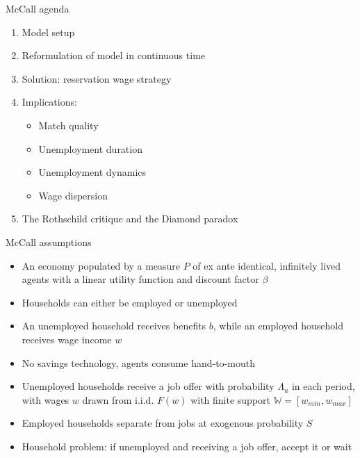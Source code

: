 \documentclass[9pt]{beamer}
\newcommand{\bit}{\begin{itemize}}
\newcommand{\eit}{\end{itemize}}
\newcommand{\ben}{\begin{enumerate}}
\newcommand{\een}{\end{enumerate}}
\newcommand{\bc}{\color{blue}}
\newcommand{\rc}{\color{red}}
\begin{document}
\begin{frame}{McCall agenda}

\ben
\setlength\itemsep{1.5em}
\item Model setup

\item Reformulation of model in continuous time

\item Solution: reservation wage strategy

\item Implications:
\bit
\item Match quality
\item Unemployment duration
\item Unemployment dynamics
\item Wage dispersion
\eit

\item The Rothschild critique and the Diamond paradox
\een

\end{frame}





\begin{frame}{McCall assumptions}

\bit
\setlength\itemsep{1.5em}

\item An economy populated by a measure $P$ of ex ante identical, infinitely lived agents with a linear utility function and discount factor $\beta$

\item Households can either be {\bc employed} or {\rc unemployed}

\item An {\rc unemployed} household receives benefits {\rc $b$}, while an {\bc employed} household receives wage income {\bc$w$}

\item No savings technology, agents consume hand-to-mouth

\item Unemployed households receive a job offer with probability $\Lambda_{u}$ in each period, with wages $w$ drawn from i.i.d. $F(w)$ with finite support $\mathds{W}=[ w_{min}, w_{max}]$   

\item Employed households separate from jobs at exogenous probability $S$

\item Household problem: if unemployed and receiving a job offer, accept it or wait
\eit

\end{frame}
\end{document}
